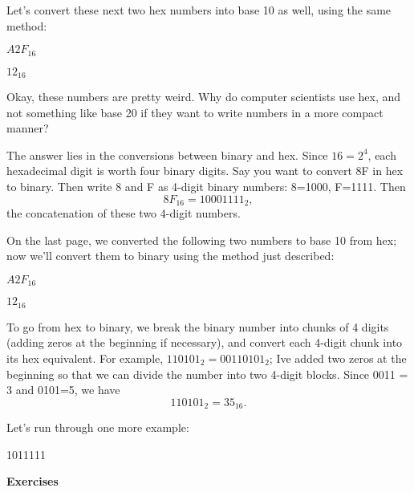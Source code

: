 \documentclass{article}
\begin{document}
Let's convert these next two hex numbers into base 10 as well, using the same method:

\vspace{0.3in}

$A2F_{16}$

\vfill

$12_{16}$

\vfill

\newpage

Okay, these numbers are pretty weird. Why do computer scientists use hex, and not something like base 20 if they want to write numbers in a more compact manner?

The answer lies in the conversions between binary and hex. Since $16=2^4$, each hexadecimal digit is worth four binary digits. Say you want to convert 8F in hex to binary. Then write 8 and F as 4-digit binary numbers: 8=1000, F=1111. Then 
\[8F_{16}=10001111_2,\]
the concatenation of these two 4-digit numbers.

On the last page, we converted the following two numbers to base 10 from hex; now we'll convert them to binary using the method just described:

\vspace{0.3in}

$A2F_{16}$

\vspace{2in}

$12_{16}$

\vspace{2in}

To go from hex to binary, we break the binary number into chunks of 4 digits (adding zeros at the beginning if necessary), and convert each 4-digit chunk into its hex equivalent. For example, $110101_2 = 00110101_2$; Ive added two zeros at the beginning so that we can divide the number into two 4-digit blocks. Since 0011 = 3 and 0101=5, we have
\[110101_2 = 35_{16}.\]

Let's run through one more example:

\vspace{0.3in}

1011111

\vfill

\newpage


\noindent\textbf{Exercises}

\vspace{0.2in}
\end{document}
